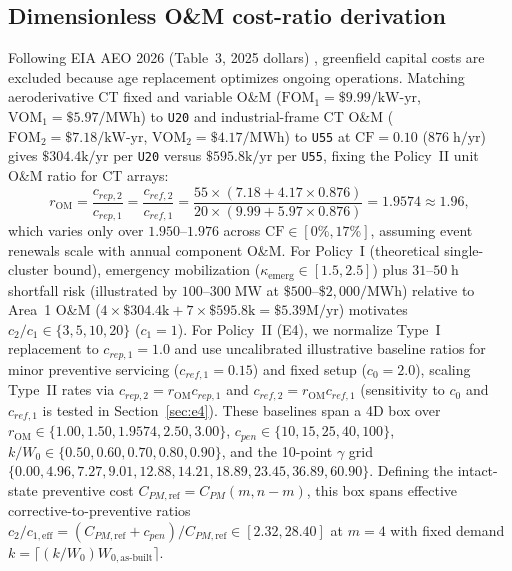 \documentclass{elektr}
\begin{document}
\subsection{Dimensionless O\&M cost-ratio derivation}
Following EIA AEO 2026 (Table~3, 2025 dollars) \cite{eia2026}, greenfield capital costs are excluded because age replacement optimizes ongoing operations. Matching aeroderivative CT fixed and variable O\&M ($\mathrm{FOM}_1 = \$9.99/\text{kW-yr}$, $\mathrm{VOM}_1 = \$5.97/\text{MWh}$) to \texttt{U20} and industrial-frame CT O\&M ($\mathrm{FOM}_2 = \$7.18/\text{kW-yr}$, $\mathrm{VOM}_2 = \$4.17/\text{MWh}$) to \texttt{U55} at $\mathrm{CF} = 0.10$ ($876\;\text{h/yr}$) gives $\$304.4\text{k/yr}$ per \texttt{U20} versus $\$595.8\text{k/yr}$ per \texttt{U55}, fixing the Policy~II unit O\&M ratio for CT arrays:
\begin{equation}
r_{\mathrm{OM}} = \frac{c_{rep,2}}{c_{rep,1}} = \frac{c_{ref,2}}{c_{ref,1}} = \frac{55 \times (7.18 + 4.17 \times 0.876)}{20 \times (9.99 + 5.97 \times 0.876)} = 1.9574 \approx 1.96,
\label{eq:eia_unit_ratio}
\end{equation}
which varies only over $1.950$--$1.976$ across $\mathrm{CF} \in [0\%, 17\%]$, assuming event renewals scale with annual component O\&M. For Policy~I (theoretical single-cluster bound), emergency mobilization ($\kappa_{\mathrm{emerg}} \in [1.5, 2.5]$) plus $31$--$50\;\text{h}$ shortfall risk (illustrated by $100$--$300\;\text{MW}$ at $\$500$--$\$2{,}000/\text{MWh}$) relative to Area~1 O\&M ($4 \times \$304.4\text{k} + 7 \times \$595.8\text{k} = \$5.39\text{M/yr}$) motivates $c_2/c_1 \in \{3, 5, 10, 20\}$ ($c_1 = 1$). For Policy~II (E4), we normalize Type~I replacement to $c_{rep,1} = 1.0$ and use uncalibrated illustrative baseline ratios for minor preventive servicing ($c_{ref,1} = 0.15$) and fixed setup ($c_0 = 2.0$), scaling Type~II rates via $c_{rep,2} = r_{\mathrm{OM}} c_{rep,1}$ and $c_{ref,2} = r_{\mathrm{OM}} c_{ref,1}$ (sensitivity to $c_0$ and $c_{ref,1}$ is tested in Section~\ref{sec:e4}). These baselines span a 4D box over $r_{\mathrm{OM}} \in \{1.00, 1.50, 1.9574, 2.50, 3.00\}$, $c_{pen} \in \{10, 15, 25, 40, 100\}$, $k/W_0 \in \{0.50, 0.60, 0.70, 0.80, 0.90\}$, and the 10-point $\gamma$ grid $\{0.00, 4.96, 7.27, 9.01, 12.88, 14.21, 18.89, 23.45, 36.89, 60.90\}$. Defining the intact-state preventive cost $C_{PM,\mathrm{ref}} = C_{PM}(m, n-m)$, this box spans effective corrective-to-preventive ratios $c_2/c_{1,\mathrm{eff}} = (C_{PM,\mathrm{ref}} + c_{pen})/C_{PM,\mathrm{ref}} \in [2.32, 28.40]$ at $m = 4$ with fixed demand $k = \lceil (k/W_0) W_{0,\mathrm{as\text{-}built}} \rceil$.
\end{document}
